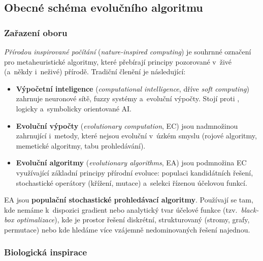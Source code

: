 \documentclass[11pt,a4paper]{article}
\theoremstyle{definition}
\begin{document}
\subsection{Obecné schéma evolučního algoritmu}
\label{ssec:obecne}
\subsubsection{Zařazení oboru}

\emph{Přírodou inspirované počítání} (\emph{nature-inspired computing}) je souhrnné
označení pro metaheuristické algoritmy, které přebírají principy pozorované
v~živé (a~někdy i~neživé) přírodě. Tradiční členění je následující:

\begin{itemize}
\item \textbf{Výpočetní inteligence} (\emph{computational intelligence}, dříve
  \emph{soft computing}) zahrnuje neuronové sítě, fuzzy systémy a~evoluční
  výpočty. Stojí proti , logicky a~symbolicky orientované AI.
\item \textbf{Evoluční výpočty} (\emph{evolutionary computation}, EC) jsou
  nadmnožinou zahrnující i~metody, které nejsou evoluční v~úzkém smyslu
  (rojové algoritmy, memetické algoritmy, tabu prohledávání).
\item \textbf{Evoluční algoritmy} (\emph{evolutionary algorithms}, EA) jsou
  podmnožina EC využívající základní principy přírodní evoluce: populaci
  kandidátních řešení, stochastické operátory (křížení, mutace) a~selekci
  řízenou účelovou funkcí.
\end{itemize}

EA jsou \textbf{populační stochastické prohledávací algoritmy}. Používají se
tam, kde nemáme k~dispozici gradient nebo analytický tvar účelové funkce
(tzv.\ \emph{black-box optimalizace}), kde je prostor řešení diskrétní,
strukturovaný (stromy, grafy, permutace) nebo kde hledáme více vzájemně
nedominovaných řešení najednou.

\subsubsection{Biologická inspirace}
\end{document}
